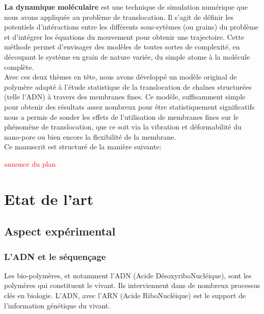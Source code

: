 \documentclass[a4paper,11pt]{article}
\begin{document}
\textbf{La dynamique moléculaire} est une technique de simulation numérique que nous avons appliquée au problème de translocation. Il s'agit de définir les potentiels d'intéractions entre les différents sous-sytèmes (ou grains) du problème et d'intégrer les équations du mouvement pour obtenir une trajectoire. Cette méthode permet d'envisager des modèles de toutes sortes de complexité, en découpant le système en grain de nature variée, du simple atome à la molécule complète.\\

Avec ces deux thèmes en t\^{e}te, nous avons développé un modèle original de polymère adapté à l'étude statistique de la translocation de cha\^{i}nes structurées (telle l'ADN) à travers des membranes fines. Ce modèle, suffisamment simple pour obtenir des résultats assez nombreux pour \^{e}tre statistiquement significatifs nous a permis de sonder les effets de l'utilisation de membranes fines sur le phénomène de translocation, que ce soit via la vibration et déformabilité du nano-pore ou bien encore la flexibilité de la membrane.\\

Ce manuscrit est structuré de la manière suivante:


\textcolor{red}{annonce du plan}

\newpage

\tableofcontents



\newpage 

\section{Etat de l'art}

\subsection{Aspect expérimental}

\subsubsection{L'ADN et le séquençage}

Les bio-polymères, et notamment l'ADN (Acide DésoxyriboNucléique), sont les polymères qui constituent le vivant. Ils interviennent dans de nombreux processus clés en biologie.  L'ADN, avec l'ARN (Acide RiboNucléique) est le support de l'information génétique du vivant. \\
\end{document}
